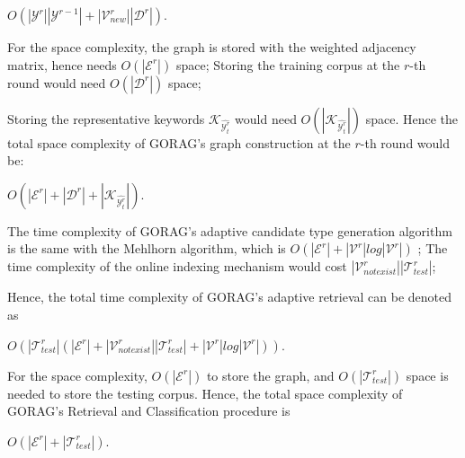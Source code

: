 \begin{center}
	$O(|\mathcal{Y}^r||\mathcal{Y}^{r-1}|+|\mathcal{V}_{new}^r||\mathcal{D}^r|)$. 
\end{center}


For the space complexity, the graph is stored with the weighted adjacency matrix, hence needs $O(|\mathcal{E}^r|)$ space; Storing the training corpus at the $r$-th round would need $O(|\mathcal{D}^r|)$ space; 

Storing the representative keywords $\mathcal{K}_{\hat{\mathcal{Y}_t^r}}$ would need $O(|\mathcal{K}_{\hat{\mathcal{Y}_t^r}}|)$ space. Hence the total space complexity of GORAG's graph construction at the $r$-th round would be: 

\begin{center}
	$O(|\mathcal{E}^r|+|\mathcal{D}^r|+|\mathcal{K}_{\hat{\mathcal{Y}_t^r}}|)$. 
\end{center}



The time complexity of GORAG's adaptive candidate type generation algorithm is the same with the Mehlhorn algorithm, which is $O(|\mathcal{E}^r|+|\mathcal{V}^r|log|\mathcal{V}^r|)$ \cite{MEHLHORN1988125}; The time complexity of the online indexing mechanism would cost $|\mathcal{V}_{notexist}^r||\mathcal{T}_{test}^r|$; 

Hence, the total time complexity of GORAG's adaptive retrieval can be denoted as
\begin{center} $O(|\mathcal{T}_{test}^r|(|\mathcal{E}^r|+|\mathcal{V}_{notexist}^r||\mathcal{T}_{test}^r|+|\mathcal{V}^r|log|\mathcal{V}^r|)).$
\end{center}


For the space complexity, $O(|\mathcal{E}^r|)$ to store the graph, and $O(|\mathcal{T}_{test}^r|)$ space is needed to store the testing corpus. Hence, the total space complexity of GORAG's Retrieval and Classification procedure is 
\begin{center}
	$O(|\mathcal{E}^r|+|\mathcal{T}_{test}^r|).$
\end{center}


